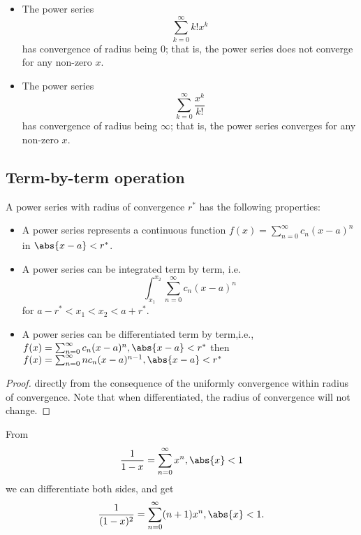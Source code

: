 \begin{refsection}
\begin{corollary}\cite[256]{fitzpatrick2006advanced}\hfill
	\begin{itemize}
		\item The power series 
		$$\sum_{k=0}^\infty k!x^k$$
		has convergence of radius being 0; that is, the power series does not converge for any non-zero $x$.
		\item The power series 
		$$\sum_{k=0}^\infty \frac{x^k}{k!}$$
		has convergence of radius being $\infty$; that is, the power series converges for any non-zero $x$.
	\end{itemize}	
\end{corollary}




\subsection{Term-by-term operation}
\begin{theorem}\label{ch:function-sequences-series--approximation:th:uniformconvergentpowerseriestermbytermproperties}
	\cite[424]{kaplan1973advanced}A power series with radius of convergence $r^*$ has the following properties:
	\begin{itemize}
		\item A power series represents a continuous function $f(x) = \sum_{n=0}^\infty c_n(x-a)^n$in $\abs{x-a} < r^*$.
		\item A power series can be integrated term by term, i.e.
		$$\int_{x_1}^{x_2} \sum_{n=0}^\infty c_n(x-a)^n$$
		for $a-r^*<x_1<x_2<a+r^*$.
		\item A power series can be differentiated term by term,i.e., 
		$f(x) = \sum_{n=0}^\infty c_n(x-a)^n, \abs{x-a}<r^*$
		then
		$f(x) = \sum_{n=0}^\infty nc_n(x-a)^{n-1},\abs{x-a}<r^*$
	\end{itemize}
\end{theorem}
\begin{proof}
	directly from the consequence of the uniformly convergence within radius of convergence. Note that when differentiated, the radius of convergence will not change.
\end{proof}


\begin{example}
	From $$\frac{1}{1-x} = \sum_{n=0}^\infty x^n, \abs{x}<1$$
	we can differentiate both sides, and get
	$$\frac{1}{(1-x)^2} = \sum_{n=0}^\infty (n+1) x^n, \abs{x}<1.$$
\end{example}



\end{refsection}
